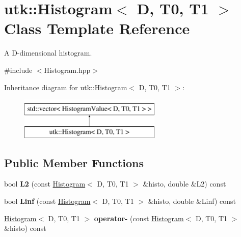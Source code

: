 \hypertarget{classutk_1_1Histogram}{\section{utk\-:\-:Histogram$<$ D, T0, T1 $>$ Class Template Reference}
\label{classutk_1_1Histogram}
}


A D-\/dimensional histogram.  




{\ttfamily \#include $<$Histogram.\-hpp$>$}

Inheritance diagram for utk\-:\-:Histogram$<$ D, T0, T1 $>$\-:\begin{figure}[H]
\begin{center}
\leavevmode
\includegraphics[height=2.000000cm]{classutk_1_1Histogram}
\end{center}
\end{figure}
\subsection*{Public Member Functions}
\begin{DoxyCompactItemize}
\item 
\hypertarget{classutk_1_1Histogram_a849d0b6f5d881f518791cd7f2e794018}{bool {\bfseries L2} (const \hyperlink{classutk_1_1Histogram}{Histogram}$<$ D, T0, T1 $>$ \&histo, double \&L2) const }\label{classutk_1_1Histogram_a849d0b6f5d881f518791cd7f2e794018}

\item 
\hypertarget{classutk_1_1Histogram_a9a56bf7a2d5178aef2862eb0c78fe92e}{bool {\bfseries Linf} (const \hyperlink{classutk_1_1Histogram}{Histogram}$<$ D, T0, T1 $>$ \&histo, double \&Linf) const }\label{classutk_1_1Histogram_a9a56bf7a2d5178aef2862eb0c78fe92e}

\item 
\hypertarget{classutk_1_1Histogram_a3bf6f55d31e01d4406919fe5a93ba521}{\hyperlink{classutk_1_1Histogram}{Histogram}$<$ D, T0, T1 $>$ {\bfseries operator-\/} (const \hyperlink{classutk_1_1Histogram}{Histogram}$<$ D, T0, T1 $>$ \&histo) const }\label{classutk_1_1Histogram_a3bf6f55d31e01d4406919fe5a93ba521}

\end{DoxyCompactItemize}



